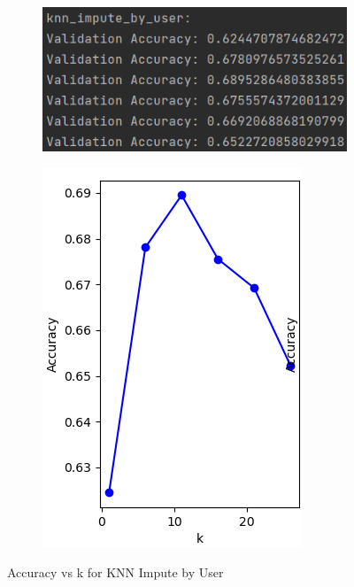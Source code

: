 \documentclass{article}
\begin{document}
\begin{figure}[H]
    \centering
    \begin{subfigure}{0.45\textwidth}
        \includegraphics[width=\textwidth]{knn_impute_by_user_result.png}
    \end{subfigure}
    \hfill
    \begin{subfigure}{0.35\textwidth}
        \includegraphics[width=\textwidth]{knn_impute_by_user_plot.png}
    \end{subfigure}
    \caption{Accuracy vs k for KNN Impute by User}
\end{figure}
\end{document}
